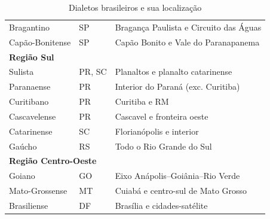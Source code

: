 \begin{table}[ht]
\begin{tabular}{lll}
Bragantino        & SP                     & Bragança Paulista e Circuito das Águas\\
Capão-Bonitense   & SP                     & Capão Bonito e Vale do Paranapanema   \\
\hline
\multicolumn{3}{l}{\textbf{Região Sul}} \\ \hline
Sulista      & PR, SC                & Planaltos e planalto catarinense   \\
Paranaense   & PR                    & Interior do Paraná (exc. Curitiba) \\
Curitibano   & PR                    & Curitiba e RM                      \\
Cascavelense & PR                    & Cascavel e fronteira oeste         \\
Catarinense  & SC                    & Florianópolis e interior           \\
Gaúcho       & RS                    & Todo o Rio Grande do Sul           \\
\hline
\multicolumn{3}{l}{\textbf{Região Centro-Oeste}} \\ \hline
Goiano         & GO & Eixo Anápolis–Goiânia–Rio Verde  \\
Mato-Grossense & MT & Cuiabá e centro-sul de Mato Grosso \\
Brasiliense    & DF & Brasília e cidades-satélite        \\
\hline
\end{tabular}
\caption{Dialetos brasileiros e sua localização}
\label{tab:tabela-dialetos}
\end{table}



